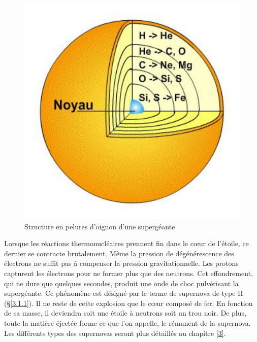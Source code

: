 \begin{figure}[H]
	\centering
	\includegraphics[scale=0.3]{images/oignon}
	\caption[Structure en pelures d'oignon d'une supergéante]{Structure en pelures d'oignon d'une supergéante}
	\label{Fig. 2.6}
\end{figure}\newpage

Lorsque les réactions thermonucléaires prennent fin dans le cœur de l’étoile, ce dernier se contracte brutalement. Même la pression de dégénérescence des électrons ne suffit pas à compenser la pression gravitationnelle. Les protons capturent les électrons pour ne former plus que des neutrons. Cet effondrement, qui ne dure que quelques secondes, produit une onde de choc pulvérisant la supergéante. Ce phénomène est désigné par le terme de supernova de type II (§\ref{3.1.1}). Il ne reste de cette explosion que le cœur composé de fer. En fonction de sa masse, il deviendra soit une étoile à neutrons soit un trou noir. De plus, toute la matière éjectée forme ce que l’on appelle, le rémanent de la supernova. Les différents types des supernovas seront plus détaillés au chapitre \ref{3}.

